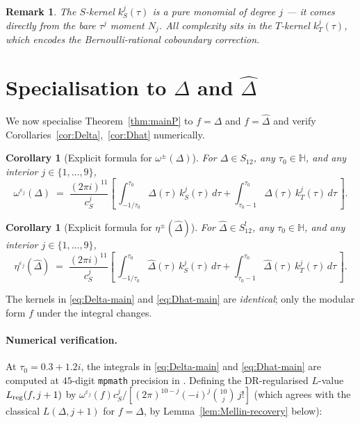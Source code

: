 \documentclass[11pt,letterpaper]{article}
\newtheorem{corollary}[theorem]{Corollary}
\newtheorem{remark}[theorem]{Remark}
\newcommand{\HH}{\mathbb{H}}
\newcommand{\Dhat}{\widehat{\Delta}}
\newcommand{\eps}{\varepsilon}
\begin{document}
\begin{remark}\label{rem:S-kernel-monomial}
The $S$-kernel $k_S^j(\tau)$ is a pure monomial of degree $j$ --- it
comes directly from the bare $\tau^j$ moment $N_j$.  All complexity sits
in the $T$-kernel $k_T^j(\tau)$, which encodes the Bernoulli-rational
coboundary correction.
\end{remark}

\section{Specialisation to \texorpdfstring{$\Delta$ and $\Dhat$}{Delta and Dhat}}\label{sec:specialisation}

We now specialise Theorem~\ref{thm:mainP} to $f = \Delta$ and $f = \Dhat$
and verify Corollaries~\ref{cor:Delta},~\ref{cor:Dhat} numerically.

\begin{corollary}[Explicit formula for $\omega^\pm(\Delta)$]\label{cor:Delta-explicit}
For $\Delta \in S_{12}$, any $\tau_0 \in \HH$, and any interior $j \in \{1, \ldots, 9\}$,
\begin{equation}\label{eq:Delta-main}
  \omega^{\eps_j}(\Delta) \;=\; \frac{(2\pi i)^{11}}{c_S^j}
    \left[\,\int_{-1/\tau_0}^{\tau_0}\!\!\Delta(\tau)\,k_S^j(\tau)\,d\tau
        + \int_{\tau_0 - 1}^{\tau_0}\!\!\Delta(\tau)\,k_T^j(\tau)\,d\tau\,\right].
\end{equation}
\end{corollary}

\begin{corollary}[Explicit formula for $\eta^\pm(\Dhat)$]\label{cor:Dhat-explicit}
For $\Dhat \in S_{12}^!$, any $\tau_0 \in \HH$, and any interior $j \in \{1, \ldots, 9\}$,
\begin{equation}\label{eq:Dhat-main}
  \eta^{\eps_j}(\Dhat) \;=\; \frac{(2\pi i)^{11}}{c_S^j}
    \left[\,\int_{-1/\tau_0}^{\tau_0}\!\!\Dhat(\tau)\,k_S^j(\tau)\,d\tau
        + \int_{\tau_0 - 1}^{\tau_0}\!\!\Dhat(\tau)\,k_T^j(\tau)\,d\tau\,\right].
\end{equation}
\end{corollary}

The kernels in \eqref{eq:Delta-main} and \eqref{eq:Dhat-main} are
\emph{identical}; only the modular form $f$ under the integral changes.

\paragraph{Numerical verification.}
At $\tau_0 = 0.3 + 1.2i$, the integrals in \eqref{eq:Delta-main} and
\eqref{eq:Dhat-main} are computed at $45$-digit \texttt{mpmath} precision
in \cite{Notebook}.  Defining the DR-regularised $L$-value
$L_{\rm reg}(f, j+1)$ by $\omega^{\eps_j}(f) c_S^j /
[(2\pi)^{10-j}(-i)^j\binom{10}{j}\,j!]$ (which agrees with the classical
$L(\Delta, j+1)$ for $f = \Delta$, by Lemma~\ref{lem:Mellin-recovery}
below):
\end{document}
